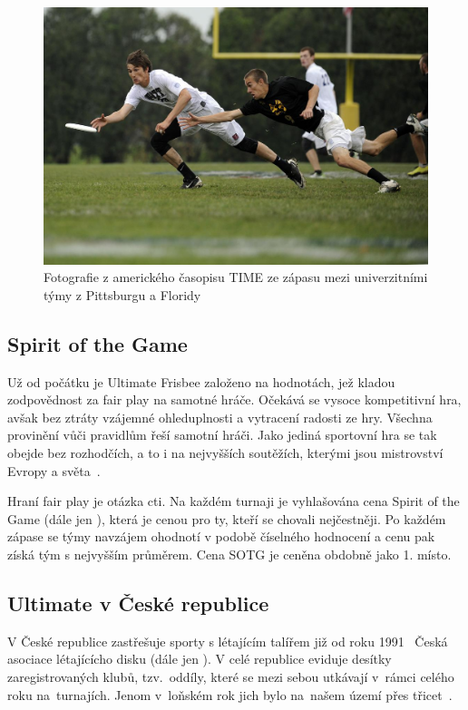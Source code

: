 \begin{figure}[ht!]
  \centering
  \includegraphics[width=130mm]{./images/ultimate-frisbee.jpg}
  \caption{Fotografie z amerického časopisu TIME ze zápasu mezi
    univerzitními týmy z Pittsburgu a Floridy~\cite{ultimate_time}\label{overflow}
    }
\end{figure}

\subsection{Spirit of the Game}

Už od počátku je Ultimate Frisbee založeno na hodnotách, jež kladou zodpovědnost za fair play na samotné hráče.
Očekává se vysoce kompetitivní hra, avšak bez ztráty vzájemné ohleduplnosti a vytracení radosti ze hry.
Všechna provinění vůči pravidlům řeší samotní hráči. Jako jediná sportovní hra se tak obejde bez rozhodčích, a to i
na nejvyšších soutěžích, kterými jsou mistrovství Evropy a světa~\cite{sotg}.

Hraní fair play je otázka cti. Na každém turnaji je vyhlašována cena Spirit of the Game (dále jen ),
která je cenou pro ty, kteří se chovali nejčestněji. Po každém zápase se týmy navzájem ohodnotí
v podobě číselného hodnocení a cenu pak získá tým s nejvyšším průměrem. Cena SOTG
je ceněna obdobně jako 1. místo.

\subsection{Ultimate v České republice}

V České republice zastřešuje sporty s létajícím talířem již od roku 1991~\cite{cald_historie} Česká asociace
lé\-ta\-jícícho disku (dále jen ). V celé republice eviduje desítky zaregistrovaných
klubů, tzv.~oddíly, které se mezi sebou utkávají v~rámci celého roku na~turnajích.
Jenom v~loňském rok jich bylo na~našem území přes třicet~\cite{cald_kalendar}.

